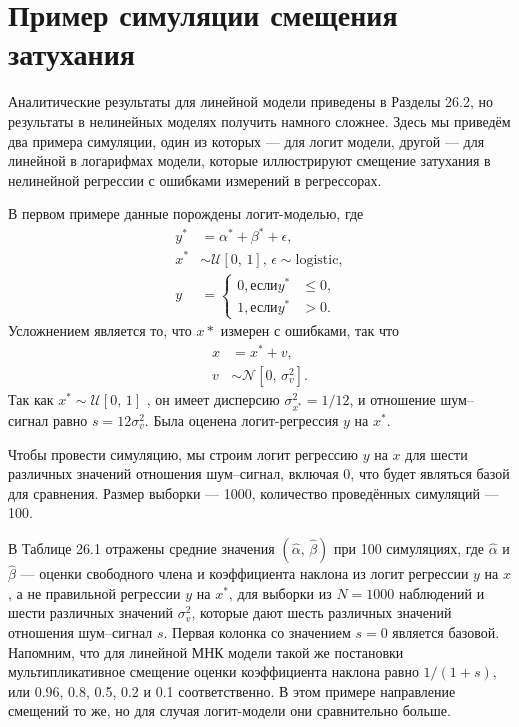 \section{Пример симуляции смещения затухания} 
Аналитические результаты для линейной модели приведены в Разделы 26.2, но результаты в нелинейных моделях получить намного сложнее. Здесь мы приведём два примера симуляции, один из которых --- для логит модели, другой --- для линейной в логарифмах модели, которые иллюстрируют смещение затухания в нелинейной регрессии с ошибками измерений в регрессорах.

В первом примере данные порождены логит-моделью, где
\begin{align*}
y^* &=\alpha^* + \beta^* + \epsilon, \\
x^* &\sim \mathcal{U}[0, \, 1], \, \epsilon \sim \text{logistic}, \\
y &= 
\begin{cases}
0, \text{если} y^* &\leqslant0 ,\\
1, \text{если} y^* &>0.
\end{cases}
\end{align*}
Усложнением является то, что $x*$ измерен с ошибками, так что
\begin{align*}
x &=x^*+v, \\
v &\sim \mathcal{N}[0, \, \sigma^2_v].
\end{align*}
Так как $x^* \sim \mathcal{U}[0, \, 1]$ , он имеет дисперсию $\sigma^2_{x^*}=1/12$, и отношение шум--сигнал равно $s=12\sigma^2_v$. Была оценена логит-регрессия $y$ на $x^*$.

Чтобы провести симуляцию, мы строим логит регрессию $y$ на $x$ для шести различных значений отношения шум--сигнал, включая 0, что будет являться базой для сравнения. Размер выборки --- 1000, количество проведённых симуляций --- 100. 

В Таблице 26.1 отражены средние значения $(\widehat{\alpha}, \, \widehat{\beta})$ при 100 симуляциях, где $\widehat{\alpha}$ и $\widehat{\beta}$ --- оценки свободного члена и коэффициента наклона из логит регрессии $y$ на $x$, а не правильной регрессии $y$ на $x^*$, для выборки из $N=1000$ наблюдений и шести различных значений $\sigma^2_v$, которые дают шесть различных значений отношения шум--сигнал $s$. Первая колонка со значением $s=0$ является базовой. Напомним, что для линейной МНК модели такой же постановки  мультипликативное смещение оценки коэффициента наклона равно $1/(1+s)$, или 0.96, 0.8, 0.5, 0.2 и 0.1 соответственно. В этом примере  направление смещений то же, но для случая логит-модели они сравнительно больше.


